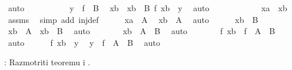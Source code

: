 \begin{isabellebody}
\begin{exercise}[subtitle=Svojstva funkcija]
\ auto\isanewline
\ \ \ \ \isamarkupfalse%
\isanewline
\ \ \ \ \isamarkupfalse%
\ {\isacartoucheopen}y\ {\isasymin}\ f\ {\isacharbackquote}{\kern0pt}\ B{\isacartoucheclose}\ \isamarkupfalse%
\ xb\ \ {\isachardoublequoteopen}xb\ {\isasymin}\ B{\isachardoublequoteclose}\ {\isachardoublequoteopen}f\ xb\ {\isacharequal}{\kern0pt}\ y{\isachardoublequoteclose}\ \isamarkupfalse%
\ auto\isanewline
\ \ \ \ \isamarkupfalse%
\ \isanewline
\ \ \ \ \isamarkupfalse%
\ {\isachardoublequoteopen}xa\ {\isacharequal}{\kern0pt}\ xb{\isachardoublequoteclose}\ \isamarkupfalse%
\ assms\ \isamarkupfalse%
\ {\isacharparenleft}{\kern0pt}simp\ add{\isacharcolon}{\kern0pt}\ inj{\isacharunderscore}{\kern0pt}def{\isacharparenright}{\kern0pt}\isanewline
\ \ \ \ \isamarkupfalse%
\ {\isacartoucheopen}xa\ {\isasymin}\ A{\isacartoucheclose}\ \isamarkupfalse%
\ {\isachardoublequoteopen}xb\ {\isasymin}\ A{\isachardoublequoteclose}\ \isamarkupfalse%
\ auto\isanewline
\ \ \ \ \isamarkupfalse%
\ {\isacartoucheopen}xb\ {\isasymin}\ B{\isacartoucheclose}\ \isamarkupfalse%
\ {\isachardoublequoteopen}xb\ {\isasymin}\ A\ {\isasymand}\ xb\ {\isasymin}\ B{\isachardoublequoteclose}\ \isamarkupfalse%
\ auto\isanewline
\ \ \ \ \isamarkupfalse%
\ \isamarkupfalse%
\ {\isachardoublequoteopen}xb\ {\isasymin}\ A\ {\isasyminter}\ B{\isachardoublequoteclose}\ \isamarkupfalse%
\ auto\isanewline
\ \ \ \ \isamarkupfalse%
\ \isamarkupfalse%
\ {\isachardoublequoteopen}f\ xb\ {\isasymin}\ f\ {\isacharbackquote}{\kern0pt}\ {\isacharparenleft}{\kern0pt}A\ {\isasyminter}\ B{\isacharparenright}{\kern0pt}{\isachardoublequoteclose}\ \isamarkupfalse%
\ auto\isanewline
\ \ \ \ \isamarkupfalse%
\ {\isacartoucheopen}f\ xb\ {\isacharequal}{\kern0pt}\ y{\isacartoucheclose}\ \isamarkupfalse%
\ {\isachardoublequoteopen}y\ {\isasymin}\ f\ {\isacharbackquote}{\kern0pt}\ {\isacharparenleft}{\kern0pt}A\ {\isasyminter}\ B{\isacharparenright}{\kern0pt}{\isachardoublequoteclose}\ \isamarkupfalse%
\ auto\isanewline
\ \ \isamarkupfalse%
\isanewline
{}\isamarkupfalse%
%
\endisatagproof
{\isafoldproof}%
%
\isadelimproof
%
\endisadelimproof
%
\begin{isamarkuptext}%
: Razmotriti teoremu  i .%

\end{isamarkuptext}
\end{exercise}
\end{isabellebody}

